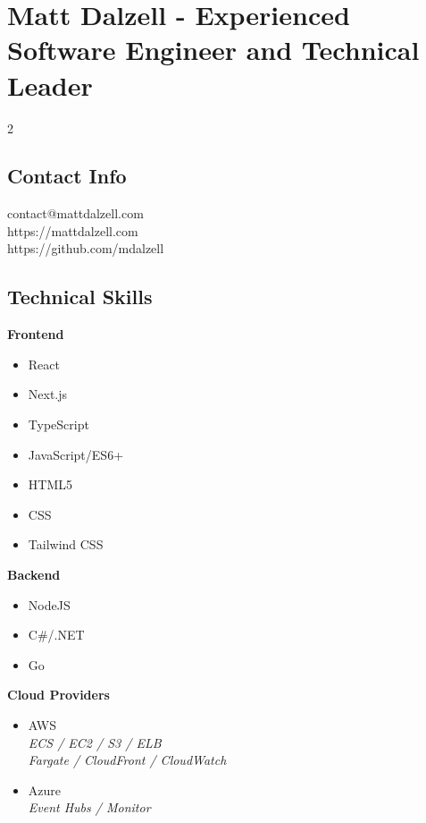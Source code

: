 \documentclass[10pt]{article}
\begin{document}

\section*{Matt Dalzell - {\large Experienced Software Engineer and Technical Leader}}

\setlength{\columnsep}{4em}
\setlength{\columnseprule}{0.1pt}
\begin{paracol}{2}

    \subsection*{Contact Info}
    contact@mattdalzell.com \\
    https://mattdalzell.com \\
    https://github.com/mdalzell

    \subsection*{Technical Skills}

    \textbf{Frontend}
    \begin{itemize}
        \item React
        \item Next.js
        \item TypeScript
        \item JavaScript/ES6+
        \item HTML5
        \item CSS
        \item Tailwind CSS
    \end{itemize}

    \noindent \textbf{Backend}
    \begin{itemize}
        \item NodeJS
        \item C\#/.NET
        \item Go
    \end{itemize}

    \noindent \textbf{Cloud Providers}
    \begin{itemize}
        \item AWS  \\ {\footnotesize{\textit{ECS / EC2 / S3 / ELB \\ Fargate / CloudFront / CloudWatch}}}
        \item Azure \\ {\footnotesize{\textit{Event Hubs / Monitor}}}
    \end{itemize}


\end{paracol}
\end{document}
